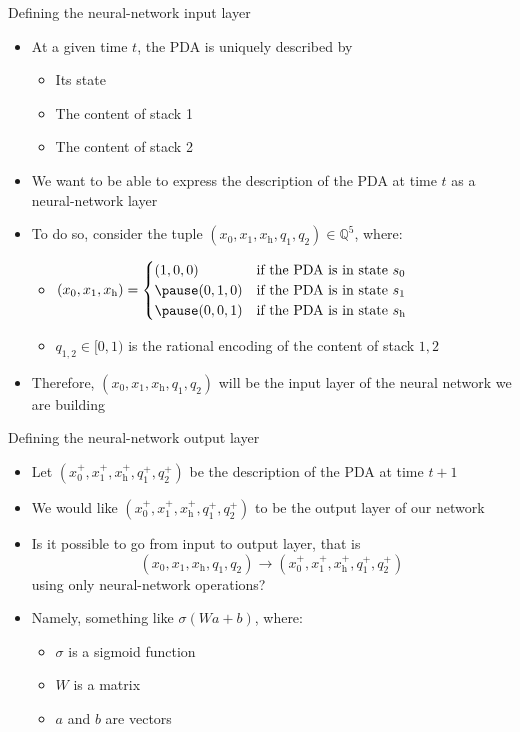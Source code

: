 \documentclass{beamer}
\newcommand{\Q}{\mathbb{Q}}
\newcommand{\h}{_\text{h}}
\begin{document}
\begin{frame}{Defining the neural-network input layer}
	\begin{itemize}
		\item At a given time $t$, the PDA is uniquely described by
		\begin{itemize}
			\pause
			\item Its state
			\pause
			\item The content of stack 1
			\pause
			\item The content of stack 2
		\end{itemize}
		\pause
		\item We want to be able to express the description of the PDA at time $t$ as a neural-network layer
		\pause
		\item To do so, consider the tuple $(x_0,x_1,x\h,q_1,q_2)\in\Q^5$, where:
		\begin{itemize}
			\pause
			\item
			$
				(x_0,x_1,x\h)= 
					\begin{cases}
						(1,0,0)&\text{if the PDA is in state }s_0\\\pause
						(0,1,0)&\text{if the PDA is in state }s_1\\\pause
						(0,0,1)&\text{if the PDA is in state }s\h
					\end{cases}
			$
			\pause
			\item $q_{1,2}\in[0,1)$ is the rational encoding of the content of stack $1,2$
		\end{itemize}	
		\pause
		\item Therefore, $(x_0,x_1,x\h,q_1,q_2)$ will be the \textcolor{unifiRed}{input layer} of the neural network we are building
	\end{itemize}
\end{frame}

\begin{frame}{Defining the neural-network output layer}
	\begin{itemize}
		\item Let $(x_0^+,x_1^+,x\h^+,q_1^+,q_2^+)$ be the description of the PDA at time $t+1$	
		\pause
		\item We would like $(x_0^+,x_1^+,x\h^+,q_1^+,q_2^+)$ to be the \textcolor{unifiRed}{output layer} of our network
		\pause
		\item Is it possible to go from input to output layer, that is $$(x_0,x_1,x\h,q_1,q_2)\longrightarrow(x_0^+,x_1^+,x\h^+,q_1^+,q_2^+)$$ using only neural-network operations?
		\pause
		\item Namely, something like $\sigma(Wa+b)$, where:
		\begin{itemize}
			\pause
			\item $\sigma$ is a \textcolor{unifiRed}{sigmoid function}
			\pause
			\item $W$ is a matrix
			\pause
			\item $a$ and $b$ are vectors
		\end{itemize}
	\end{itemize}
\end{frame}
\end{document}
